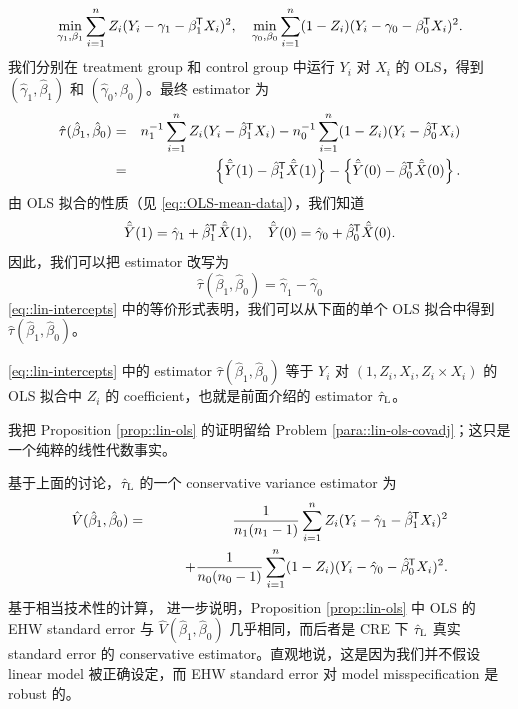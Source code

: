 $$
\min_{\gamma_1 , \beta_1 }
\sum_{i=1}^n Z_i  ( Y_i - \gamma_1 - \beta_1^{\mkern-1.5mu\mathsf{T}}  X_i )^2,\quad
\min_{\gamma_0 , \beta_0 }
\sum_{i=1}^n (1-Z_i)  ( Y_i - \gamma_0 - \beta_0^{\mkern-1.5mu\mathsf{T}}  X_i  )^2.
$$
我们分别在 treatment group 和 control group 中运行 $Y_i$ 对 $X_i$ 的 OLS，得到 $( \hat{\gamma}_1, \hat{\beta}_1 )$ 和 $( \hat{\gamma}_0, \hat{\beta}_0 )$。最终 estimator 为
\begin{eqnarray*}
 \hat{\tau}( \hat{\beta}_1, \hat{\beta}_0) &=& n_1^{-1} \sum_{i=1}^n Z_i(Y_i - \hat{\beta}_1^{\mkern-1.5mu\mathsf{T}}  X_i) 
- n_0^{-1} \sum_{i=1}^n (1-Z_i)  (Y_i - \hat{\beta}_0^{\mkern-1.5mu\mathsf{T}}  X_i) \\
&=&\left\{  \hat{\bar{Y}}(1) - \hat \beta_1^{\mkern-1.5mu\mathsf{T}} \hat{\bar{X} }(1) \right\}  
-  \left\{   \hat{\bar{Y}}(0) - \hat \beta_0^{\mkern-1.5mu\mathsf{T}} \hat{\bar{X} }(0) \right\} . 
\end{eqnarray*}
由 OLS 拟合的性质（见 \eqref{eq::OLS-mean-data}），我们知道
$$
\hat{\bar{Y}}(1) =  \hat{\gamma}_1 + \hat{\beta}_1^{\mkern-1.5mu\mathsf{T}}  \hat{\bar{X} }(1),\quad
\hat{\bar{Y}}(0) =  \hat{\gamma}_0 + \hat{\beta}_0^{\mkern-1.5mu\mathsf{T}}  \hat{\bar{X} }(0).
$$
因此，我们可以把 estimator 改写为
\begin{equation}
\label{eq::lin-intercepts}
 \hat{\tau}( \hat{\beta}_1, \hat{\beta}_0)  =  \hat{\gamma}_1 - \hat{\gamma}_0  
\end{equation}
\eqref{eq::lin-intercepts} 中的等价形式表明，我们可以从下面的单个 OLS 拟合中得到 $ \hat{\tau}( \hat{\beta}_1, \hat{\beta}_0) $。

\begin{proposition}\label{prop::lin-ols}
\eqref{eq::lin-intercepts} 中的 estimator $ \hat{\tau}( \hat{\beta}_1, \hat{\beta}_0) $ 等于 $Y_i$ 对 $(1, Z_i, X_i, Z_i\times X_i)$ 的 OLS 拟合中 $Z_i$ 的 coefficient，也就是前面介绍的 \citet{lin2013} estimator $\hat{\tau}_\textsc{L}$。
\end{proposition}

我把 Proposition \ref{prop::lin-ols} 的证明留给 Problem \ref{para::lin-ols-covadj}；这只是一个纯粹的线性代数事实。

基于上面的讨论，$\hat{\tau}_\textsc{L}$ 的一个 conservative variance estimator 为
\begin{eqnarray*}
\hat{V}(  \hat{\beta}_1, \hat{\beta}_0 ) 
&=& \frac{1}{n_1(n_1 - 1)} \sum_{i=1}^n Z_i  ( Y_i - \hat{\gamma}_1 - \hat{\beta}_1^{\mkern-1.5mu\mathsf{T}}  X_i  ) ^2 \\
&& \qquad + \frac{1}{n_0(n_0 - 1)} \sum_{i=1}^n (1-Z_i)  ( Y_i - \hat{\gamma}_0 - \hat{\beta}_0^{\mkern-1.5mu\mathsf{T}}  X_i )^2.
\end{eqnarray*}
基于相当技术性的计算，\citet{lin2013} 进一步说明，Proposition \ref{prop::lin-ols} 中 OLS 的 EHW standard error 与 $\hat{V}(  \hat{\beta}_1, \hat{\beta}_0 ) $ 几乎相同，而后者是 CRE 下 $\hat{\tau}_\textsc{L}$ 真实 standard error 的 conservative estimator。直观地说，这是因为我们并不假设 linear model 被正确设定，而 EHW standard error 对 model misspecification 是 robust 的。


